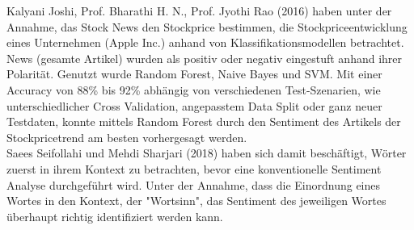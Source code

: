 Kalyani Joshi, Prof. Bharathi H. N., Prof. Jyothi Rao (2016) haben unter der Annahme, das Stock News den Stockprice bestimmen, die Stockpriceentwicklung eines Unternehmen (Apple Inc.) anhand von Klassifikationsmodellen betrachtet. News (gesamte Artikel) wurden als positiv oder negativ eingestuft anhand ihrer Polarität. Genutzt wurde Random Forest, Naive Bayes und SVM. Mit einer Accuracy von 88\% bis 92\% abhängig von verschiedenen Test-Szenarien, wie unterschiedlicher Cross Validation, angepasstem Data Split oder ganz neuer Testdaten, konnte mittels Random Forest durch den Sentiment des Artikels der Stockpricetrend am besten vorhergesagt werden. \\
Saees Seifollahi und Mehdi Sharjari (2018) haben sich damit beschäftigt, Wörter zuerst in ihrem Kontext zu betrachten, bevor eine konventionelle Sentiment Analyse durchgeführt wird. Unter der Annahme, dass die Einordnung eines Wortes in den Kontext, der "Wortsinn", das Sentiment des jeweiligen Wortes überhaupt richtig identifiziert werden kann.

